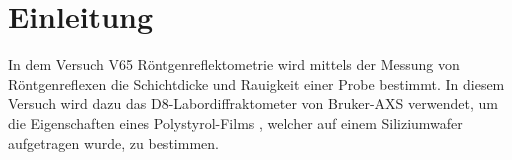 

\section{Einleitung}
In dem Versuch V65 Röntgenreflektometrie wird mittels der Messung von 
Röntgenreflexen die Schichtdicke und Rauigkeit einer Probe bestimmt. In diesem 
Versuch wird dazu das D8-Labordiffraktometer von Bruker-AXS verwendet, um die 
Eigenschaften eines Polystyrol-Films , welcher auf einem Siliziumwafer 
aufgetragen wurde, zu bestimmen.